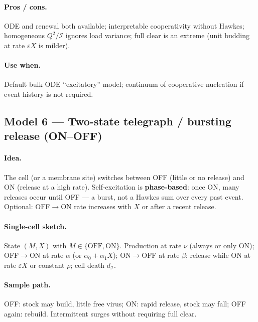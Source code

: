 \documentclass[11pt,a4paper]{article}
\newcommand{\Icell}{\mathcal{I}}
\theoremstyle{plain}
\theoremstyle{definition}
\theoremstyle{remark}
\begin{document}
\paragraph{Pros / cons.}
ODE and renewal both available; interpretable cooperativity without Hawkes;
homogeneous $Q^2/\Icell$ ignores load variance; full clear is an extreme
(unit budding at rate $\varepsilon X$ is milder).

\paragraph{Use when.}
Default bulk ODE ``excitatory'' model; continuum of cooperative nucleation if
event history is not required.

\subsection{Model 6 --- Two-state telegraph / bursting release (ON--OFF)}

\paragraph{Idea.}
The cell (or a membrane site) switches between OFF (little or no release) and
ON (release at a high rate). Self-excitation is \textbf{phase-based}: once ON,
many releases occur until OFF --- a burst, not a Hawkes sum over every past
event. Optional: OFF$\to$ON rate increases with $X$ or after a recent release.

\paragraph{Single-cell sketch.}
State $(M,X)$ with $M\in\{\mathrm{OFF},\mathrm{ON}\}$. Production at rate
$\nu$ (always or only ON); OFF$\to$ON at rate $\alpha$ (or
$\alpha_0+\alpha_1 X$); ON$\to$OFF at rate $\beta$; release while ON at rate
$\varepsilon X$ or constant $\rho$; cell death $d_{\Icell}$.

\paragraph{Sample path.}
OFF: stock may build, little free virus; ON: rapid release, stock may fall;
OFF again: rebuild. Intermittent surges without requiring full clear.
\end{document}
